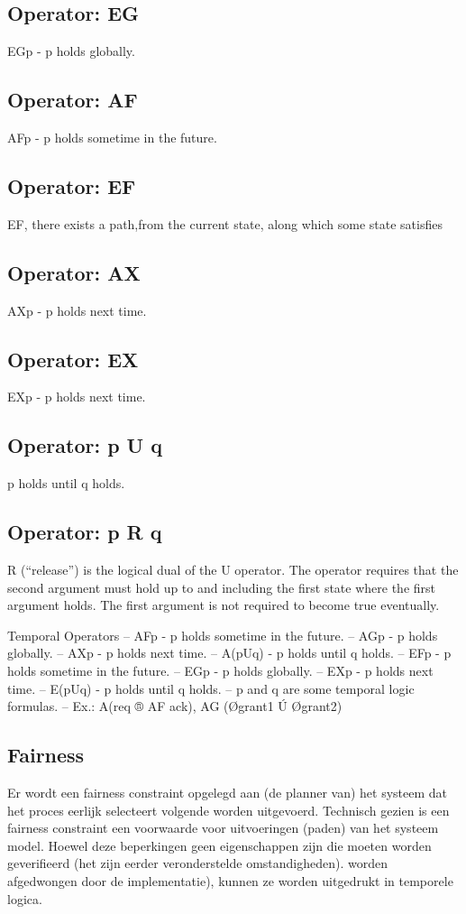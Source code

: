 \documentclass{article}
\begin{document}
	\subsection{Operator: EG}
		EGp - p holds globally.
	\subsection{Operator: AF}

			AFp - p holds sometime in the future.
	\subsection{Operator: EF}
	EF, there exists a path,from the current state, along which some state satisfies
	
	\subsection{Operator: AX}
	AXp - p holds next time.
	\subsection{Operator: EX}
	EXp - p holds next time.
	\subsection{Operator: p U q}
	p holds until q holds.
	\subsection{Operator: p R q}
	R (“release”) is the logical dual of the U operator. The operator requires
	that the second argument must hold up to and including the
	first state where the first argument holds. The first argument is not
	required to become true eventually.
	
	
	Temporal Operators
	– AFp - p holds sometime in the future.
	– AGp - p holds globally.
	– AXp - p holds next time.
	– A(pUq) - p holds until q holds.
	– EFp - p holds sometime in the future.
	– EGp - p holds globally.
	– EXp - p holds next time.
	– E(pUq) - p holds until q holds.
	– p and q are some temporal logic formulas.
	– Ex.: A(req  ® AF ack), AG (Øgrant1 Ú Øgrant2)
	
	\subsection{Fairness}
	Er wordt een fairness constraint opgelegd aan (de planner van) het systeem dat het proces eerlijk selecteert
	volgende worden uitgevoerd. Technisch gezien is een fairness constraint een voorwaarde voor uitvoeringen (paden) van het systeem
	model. Hoewel deze beperkingen geen eigenschappen zijn die moeten worden geverifieerd (het zijn eerder veronderstelde omstandigheden).
	worden afgedwongen door de implementatie), kunnen ze worden uitgedrukt in temporele logica.
	
\end{document}
